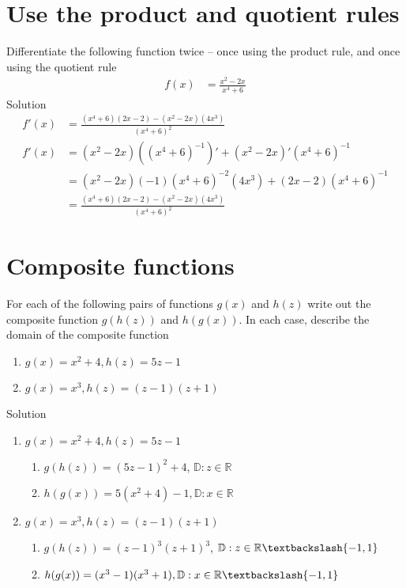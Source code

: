 \documentclass[12pt]{article}
\begin{document}
\section{Use the product and quotient rules}
Differentiate the following function twice – once using the product rule, and once using the
quotient rule
\begin{align*}
    f(x) &= \frac{x^2 -2x}{x^4 + 6}
\end{align*}
Solution
\begin{align*}
    f'(x) &= \frac{(x^4 + 6)(2x -2) - (x^2-2x)(4x^3)}{(x^4 + 6)^2}
    \\ f'(x) &= (x^2 -2x)\left((x^4 + 6)^{-1}\right)' + (x^2 -2x)'(x^4 + 6)^{-1}
    \\ &= (x^2 -2x)(-1)(x^4 + 6)^{-2}(4x^3) + (2x-2)(x^4 + 6)^{-1}
    \\&= \frac{(x^4 + 6)(2x -2) - (x^2-2x)(4x^3)}{(x^4 + 6)^2}
\end{align*}

\section{Composite functions}
For each of the following pairs of functions $g(x)$ and $h(z)$ write out the composite function
$g(h(z))$ and $h(g(x))$. In each case, describe the domain of the composite function
\begin{enumerate}
    \item $g(x) = x^2 +4, h(z) = 5z-1$
    \item $g(x) = x^3, h(z) = (z-1)(z+1)$ 
\end{enumerate}
Solution
\begin{enumerate}
    \item$g(x) = x^2 +4, h(z) = 5z-1$
    \begin{enumerate}
        \item $g(h(z)) = (5z-1)^2 +4$, $\mathbb{D}: z\in \mathbb{R}$
        \item $h(g(x)) = 5(x^2+4)-1, \mathbb{D}:x\in \mathbb{R}$
    \end{enumerate}
    \item $g(x) = x^3, h(z) = (z-1)(z+1)$ 
    \begin{enumerate}
        \item $g(h(z)) = (z-1)^3(z+1)^3$, $ \mathbb{D}:z\in \mathbb{R} \textbackslash \{-1,1\}$
        \item $h(g(x)) = (x^3-1)(x^3+1), \mathbb{D}: x\in \mathbb{R} \textbackslash \{-1,1\}$
    \end{enumerate}
\end{enumerate}
\end{document}
